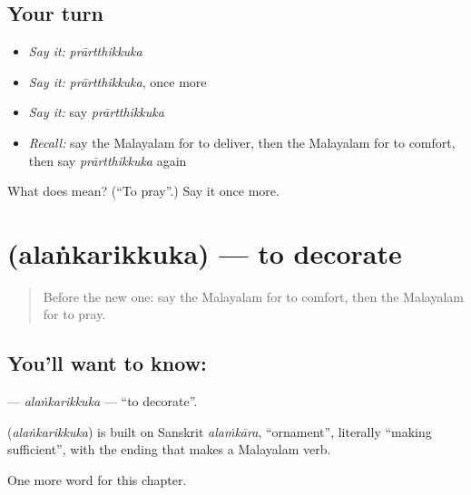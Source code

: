 \subsection*{Your turn}
\begin{itemize}
\raggedright
  \item \emph{Say it:} \emph{prārtthikkuka}
  \item \emph{Say it:} \emph{prārtthikkuka}, once more
  \item \emph{Say it:} say \emph{prārtthikkuka}
  \item \emph{Recall:} say the Malayalam for to deliver, then the Malayalam for to comfort, then say \emph{prārtthikkuka} again
\end{itemize}

\begin{tcolorbox}[breakable,colback=teal!4,colframe=teal!35!black,title={Before you move on}]
What does  mean? (\textquotedblleft{}To pray\textquotedblright{}.) Say it once more.
\end{tcolorbox}
\section[\texorpdfstring{\ml{അലങ്കരിക്കുക} (alaṅkarikkuka)}{അലങ്കരിക്കുക (alaṅkarikkuka)}]{ (alaṅkarikkuka) — to decorate}

\label{lesson:ML-C269-alankarikkuka}



\begin{quote}
Before the new one: say the Malayalam for to comfort, then the Malayalam for to pray.
\end{quote}

\subsection*{You'll want to know: }
\textbf{} — \emph{alaṅkarikkuka} — \textquotedblleft{}to decorate\textquotedblright{}.

\begin{cousinweb}
\textbf{} (\emph{alaṅkarikkuka}) is built on Sanskrit \emph{alaṁkāra}, \textquotedblleft{}ornament\textquotedblright{}, literally \textquotedblleft{}making sufficient\textquotedblright{}, with the ending that makes a Malayalam verb.
\end{cousinweb}

\begin{grammarlens}[title={What you've built}]
One more word for this chapter.
\end{grammarlens}

